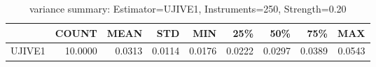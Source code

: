 \begin{table}[ht]
\centering
\caption{variance summary: Estimator=UJIVE1, Instruments=250, Strength=0.20}
\begin{tabular}{lrrrrrrrr}
\toprule
 & COUNT & MEAN & STD & MIN & 25\% & 50\% & 75\% & MAX \\
\midrule
UJIVE1 & 10.0000 & 0.0313 & 0.0114 & 0.0176 & 0.0222 & 0.0297 & 0.0389 & 0.0543 \\
\bottomrule
\end{tabular}
\end{table}
